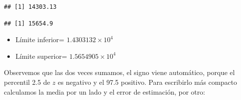 \documentclass[]{book}
\newenvironment{Shaded}{\begin{snugshade}}{\end{snugshade}}
\newcommand{\DecValTok}[1]{\textcolor[rgb]{0.00,0.00,0.81}{#1}}
\newcommand{\KeywordTok}[1]{\textcolor[rgb]{0.13,0.29,0.53}{\textbf{#1}}}
\newcommand{\NormalTok}[1]{#1}
\newcommand{\OperatorTok}[1]{\textcolor[rgb]{0.81,0.36,0.00}{\textbf{#1}}}
\newcommand{\StringTok}[1]{\textcolor[rgb]{0.31,0.60,0.02}{#1}}
\providecommand{\tightlist}{%
  \setlength{\itemsep}{0pt}\setlength{\parskip}{0pt}}
\begin{document}
\begin{Shaded}
\end{Shaded}

\begin{verbatim}
## [1] 14303.13
\end{verbatim}

\begin{Shaded}
\end{Shaded}

\begin{verbatim}
## [1] 15654.9
\end{verbatim}

\begin{itemize}
\tightlist
\item
  Límite inferior= \ensuremath{1.4303132\times 10^{4}}
\item
  Límite superior= \ensuremath{1.5654905\times 10^{4}}
\end{itemize}

Observemos que las dos veces sumamos, el signo viene automático, porque el percentil 2.5 de \(z\) es negativo y el 97.5 positivo. Para escribirlo más compacto calculamos la media por un lado y el error de estimación, por otro:

\begin{Shaded}
\end{Shaded}
\end{document}
